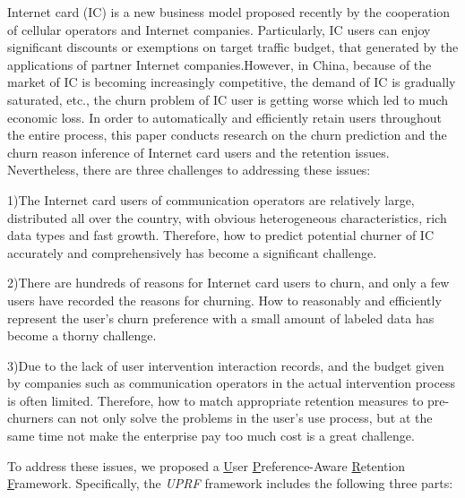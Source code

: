 \begin{abstracten}\setlength{\baselineskip}{20pt}
	
	Internet card (IC) is a new business model proposed recently by the cooperation of cellular operators and Internet companies. Particularly, IC users can enjoy significant discounts or exemptions on target traffic budget, that generated by the applications of partner Internet companies.However, in China, because of the market of IC is becoming increasingly competitive, the demand of IC is gradually saturated, etc., the churn problem of IC user is getting worse which led to much economic loss. In order to automatically and efficiently retain users throughout the entire process, this paper conducts research on the churn prediction and the churn reason inference of Internet card users and the retention issues. Nevertheless, there are three challenges to addressing these issues:\par
	1)The Internet card users of communication operators are relatively large, distributed all over the country, with obvious heterogeneous characteristics, rich data types and fast growth. Therefore, how to predict potential churner of IC accurately and comprehensively has become a significant challenge.\par
	2)There are hundreds of reasons for Internet card users to churn, and only a few users have recorded the reasons for churning. How to reasonably and efficiently represent the user’s churn preference with a small amount of labeled data has become a thorny challenge.\par
	3)Due to the lack of user intervention interaction records, and the budget given by companies such as communication operators in the actual intervention process is often limited. Therefore, how to match appropriate retention measures to pre-churners can not only solve the problems in the user's use process, but at the same time not make the enterprise pay too much cost is a great challenge.\par
	To address these issues, we proposed a \underline{U}ser \underline{P}reference-Aware \underline{R}etention \underline{F}ramework. Specifically, the \emph{UPRF} framework includes the following three parts:
	\par

\end{abstracten}
